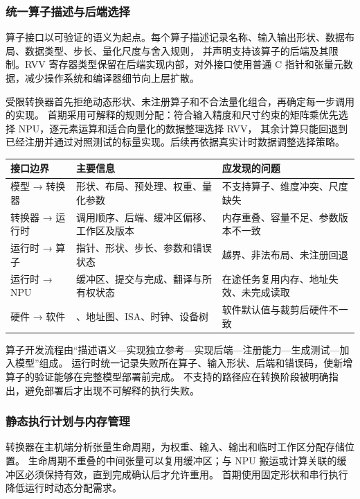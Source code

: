 \subsubsection{统一算子描述与后端选择}
算子接口以可验证的语义为起点。每个算子描述记录名称、输入输出形状、数据布局、数据类型、步长、量化尺度与舍入规则，
并声明支持该算子的后端及其限制。RVV 寄存器类型保留在后端实现内部，对外接口使用普通 C 指针和张量元数据，减少操作系统和编译器细节向上层扩散。

受限转换器首先拒绝动态形状、未注册算子和不合法量化组合，再确定每一步调用的实现。
首期采用可解释的规则分配：符合输入精度和尺寸约束的矩阵乘优先选择 NPU，逐元素运算和适合向量化的数据整理选择 RVV，
其余计算只能回退到已经注册并通过对照测试的标量实现。后续再依据真实计时数据调整选择策略。

\par{\small\renewcommand{\arraystretch}{1.2}
\noindent\begin{tabularx}{\linewidth}{@{}P{.18\linewidth}YY@{}}
\toprule
接口边界 & 主要信息 & 应发现的问题\\
\midrule
模型 → 转换器 & 形状、布局、预处理、权重、量化参数 & 不支持算子、维度冲突、尺度缺失\\
转换器 → 运行时 & 调用顺序、后端、缓冲区偏移、工作区及版本 & 内存重叠、容量不足、参数版本不一致\\
运行时 → 算子 & 指针、形状、步长、参数和错误状态 & 越界、非法布局、未注册回退\\
运行时 → NPU & 缓冲区、提交与完成、翻译与所有权状态 & 在途任务复用内存、地址失效、未完成读取\\
硬件 → 软件 & \NpuParameterHeader{}、地址图、ISA、时钟、设备树 & 软件默认值与裁剪后硬件不一致\\
\bottomrule
\end{tabularx}\par}

算子开发流程由“描述语义—实现独立参考—实现后端—注册能力—生成测试—加入模型”组成。
运行时统一记录失败所在算子、输入形状、后端和错误码，使新增算子的验证能够在完整模型部署前完成。
不支持的路径应在转换阶段被明确指出，避免部署后才出现不可解释的执行失败。

\subsubsection{静态执行计划与内存管理}
转换器在主机端分析张量生命周期，为权重、输入、输出和临时工作区分配存储位置。
生命周期不重叠的中间张量可以复用缓冲区；与 NPU 搬运或计算关联的缓冲区必须保持有效，直到完成确认后才允许重用。
首期使用固定形状和串行执行降低运行时动态分配需求。

